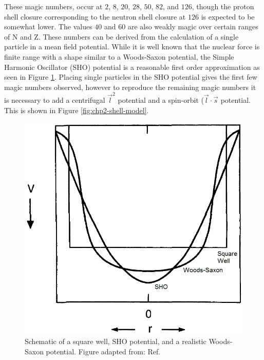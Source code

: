 These magic numbers, occur at $2$, $8$, $20$, $28$, $50$, $82$, and $126$, though the proton shell closure corresponding to the neutron shell closure at $126$ is expected to be somewhat lower. The values $40$ and $60$ are also weakly magic over certain ranges of N and Z. These numbers can be derived from the calculation of a single particle in a mean field potential. While it is well known that the nuclear force is finite range with a shape similar to a Woods-Saxon potential, the Simple Harmonic Oscillator (SHO) potential is a reasonable first order approximation as seen in Figure \ref{fig:chp2-SHOPot}. Placing single particles in the SHO potential gives the first few magic numbers observed, however to reproduce the remaining magic numbers it is necessary to add a centrifugal $\vec{l}^2$ potential and a spin-orbit ($\vec{l}\cdot\vec{s}$ potential. This is shown in Figure \ref{fig:chp2-shell-model}.

\begin{figure}[h!]
\label{fig:chp2-SHOPot}
\centerline{\includegraphics[height=0.3\textheight]{./img/c2/sho_approx.png}}
	\caption{Schematic of a square well, SHO potential, and a realistic Woods-Saxon potential. Figure adapted from: Ref.\cite{casten}}
\end{figure}

